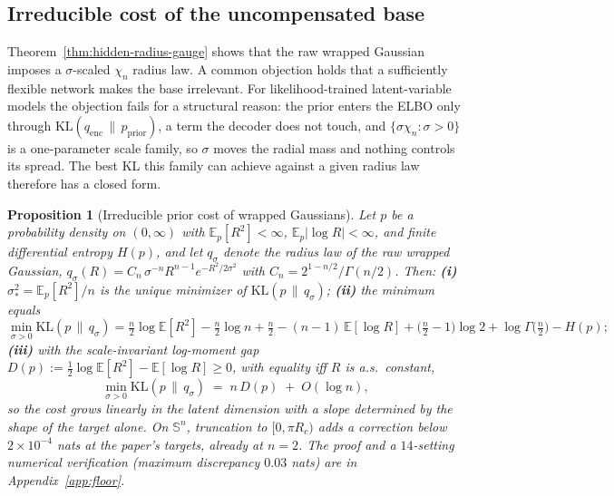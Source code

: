\documentclass{article}
\newcommand{\E}{\mathbb{E}}
\newcommand{\KL}{\mathrm{KL}}
\newtheorem{proposition}{Proposition}
\theoremstyle{definition}
\theoremstyle{remark}
\newcommand{\SSS}{\mathbb{S}}
\begin{document}
\subsection{Irreducible cost of the uncompensated base}
\label{sec:price}

Theorem~\ref{thm:hidden-radius-gauge} shows that the raw wrapped Gaussian imposes a $\sigma$-scaled $\chi_n$ radius law. A common objection holds that a sufficiently flexible network makes the base irrelevant. For likelihood-trained latent-variable models the objection fails for a structural reason: the prior enters the ELBO only through $\KL(q_{\mathrm{enc}}\,\|\,p_{\mathrm{prior}})$, a term the decoder does not touch, and $\{\sigma\chi_n:\sigma>0\}$ is a one-parameter scale family, so $\sigma$ moves the radial mass and nothing controls its spread. The best KL this family can achieve against a given radius law therefore has a closed form.

\begin{proposition}[Irreducible prior cost of wrapped Gaussians]
\label{prop:floor}
Let $p$ be a probability density on $(0,\infty)$ with $\E_p[R^2]<\infty$, $\E_p|\log R|<\infty$, and finite differential entropy $H(p)$, and let $q_\sigma$ denote the radius law of the raw wrapped Gaussian, $q_\sigma(R)=C_n\,\sigma^{-n}R^{n-1}e^{-R^2/2\sigma^2}$ with $C_n=2^{1-n/2}/\Gamma(n/2)$. Then:
\textbf{(i)} $\sigma_*^2=\E_p[R^2]/n$ is the unique minimizer of $\KL(p\,\|\,q_\sigma)$;
\textbf{(ii)} the minimum equals
\[
\min_{\sigma>0}\KL(p\,\|\,q_\sigma)
=\tfrac{n}{2}\log\E[R^2]-\tfrac{n}{2}\log n+\tfrac{n}{2}-(n{-}1)\,\E[\log R]
+\bigl(\tfrac{n}{2}-1\bigr)\log 2+\log\Gamma\!\bigl(\tfrac{n}{2}\bigr)-H(p);
\]
\textbf{(iii)} with the scale-invariant log-moment gap $D(p):=\tfrac12\log\E[R^2]-\E[\log R]\ge 0$, with equality iff $R$ is a.s.\ constant,
\[
\min_{\sigma>0}\KL(p\,\|\,q_\sigma)\;=\;n\,D(p)\;+\;O(\log n),
\]
so the cost grows linearly in the latent dimension with a slope determined by the shape of the target alone. On $\SSS^n$, truncation to $[0,\pi R_c)$ adds a correction below $2\times10^{-4}$ nats at the paper's targets, already at $n{=}2$. The proof and a $14$-setting numerical verification (maximum discrepancy $0.03$ nats) are in Appendix~\ref{app:floor}.
\end{proposition}
\end{document}
